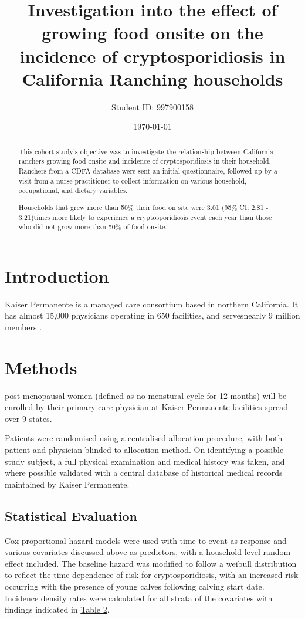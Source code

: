 \documentclass[12pt]{article}
\title{Investigation into the effect of growing food onsite on the incidence of cryptosporidiosis in California Ranching households}
\author{Student ID: 997900158}
\date{\today}
\begin{document}
	\maketitle
	\begin{abstract}
		This cohort study's objective was to investigate the relationship between California ranchers growing food onsite and incidence of cryptosporidiosis in their household.
		Ranchers from a CDFA database were sent an initial questionnaire, followed up by a visit from a nurse practitioner to collect information on various household, occupational, and dietary variables.


		Households that grew more than 50\% their food  on site were 3.01 (95\% CI: 2.81 - 3.21)times more likely to experience a cryptosporidiosis event each year than those who did not grow more than 50\% of food onsite.

	\end{abstract}

\onehalfspace
	\section{Introduction} 
		Kaiser Permanente is a managed care consortium based in northern California. It has almost 15,000 physicians operating in 650 facilities, and servesnearly 9 million members \cite{Rauber}.


	\section{Methods} 
		post menopausal women (defined as no menstural cycle for 12 months) will be enrolled by their primary care physician at Kaiser Permanente facilities spread over 9 states.

		Patients were randomised using a centralised allocation procedure, with both patient and physician blinded to allocation method. 
		On identifying a possible study subject, a full physical examination and medical history was taken, and where possible validated with a central database of historical medical records maintained by Kaiser Permanente.

	\subsection{Statistical Evaluation}
		Cox proportional hazard models were used with time to event as response and various covariates discussed above as predictors, with a household level random effect included.
		The baseline hazard was modified to follow a weibull distribution to reflect the time dependence of risk for cryptosporidiosis, with an increased risk occurring with the presence of young calves following calving start date. 
		Incidence density rates were calculated for all strata of the covariates with findings indicated in \hyperref[table2]{Table 2}.
\end{document}
